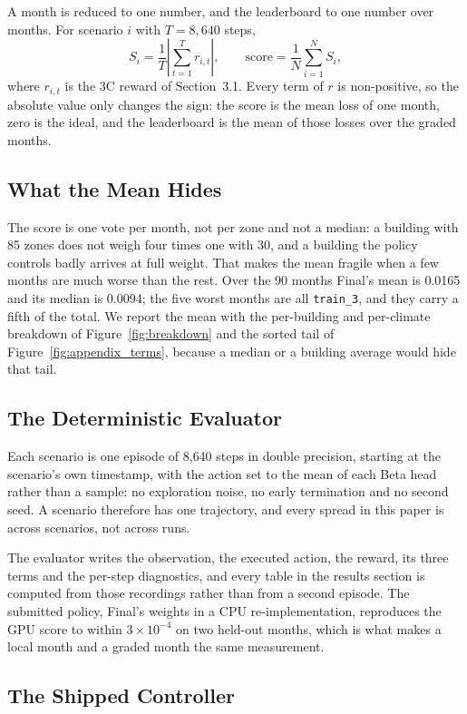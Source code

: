 \documentclass{article}
\begin{document}
A month is reduced to one number, and the leaderboard to one number over months. For scenario $i$ with $T=8{,}640$ steps,
\[
S_i=\frac{1}{T}\left|\sum_{t=1}^{T}r_{i,t}\right|,\qquad \text{score}=\frac{1}{N}\sum_{i=1}^{N}S_i,
\]
where $r_{i,t}$ is the 3C reward of Section~3.1. Every term of $r$ is non-positive, so the absolute value only changes the sign: the score is the mean loss of one month, zero is the ideal, and the leaderboard is the mean of those losses over the graded months.

\subsection{What the Mean Hides}
\label{app:abs}

The score is one vote per month, not per zone and not a median: a building with 85 zones does not weigh four times one with 30, and a building the policy controls badly arrives at full weight. That makes the mean fragile when a few months are much worse than the rest. Over the 90 months Final's mean is 0.0165 and its median is 0.0094; the five worst months are all \texttt{train\_3}, and they carry a fifth of the total. We report the mean with the per-building and per-climate breakdown of Figure~\ref{fig:breakdown} and the sorted tail of Figure~\ref{fig:appendix_terms}, because a median or a building average would hide that tail.

\subsection{The Deterministic Evaluator}
\label{app:det}

Each scenario is one episode of 8{,}640 steps in double precision, starting at the scenario's own timestamp, with the action set to the mean of each Beta head rather than a sample: no exploration noise, no early termination and no second seed. A scenario therefore has one trajectory, and every spread in this paper is across scenarios, not across runs.

The evaluator writes the observation, the executed action, the reward, its three terms and the per-step diagnostics, and every table in the results section is computed from those recordings rather than from a second episode. The submitted policy, Final's weights in a CPU re-implementation, reproduces the GPU score to within $3\times10^{-4}$ on two held-out months, which is what makes a local month and a graded month the same measurement.

\subsection{The Shipped Controller}
\label{app:baseline}
\end{document}

